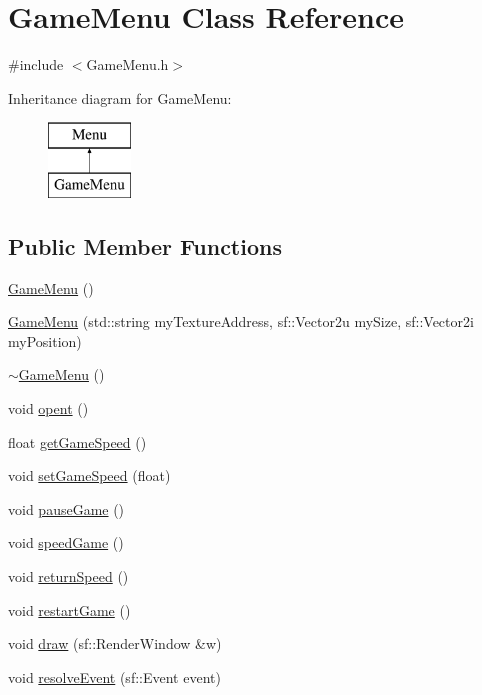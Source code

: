 \hypertarget{class_game_menu}{\section{Game\+Menu Class Reference}
\label{class_game_menu}
}


{\ttfamily \#include $<$Game\+Menu.\+h$>$}

Inheritance diagram for Game\+Menu\+:\begin{figure}[H]
\begin{center}
\leavevmode
\includegraphics[height=2.000000cm]{class_game_menu}
\end{center}
\end{figure}
\subsection*{Public Member Functions}
\begin{DoxyCompactItemize}
\item 
\hyperlink{class_game_menu_ae31c50148abf655297a2a3eab53c15a3}{Game\+Menu} ()
\item 
\hyperlink{class_game_menu_ac3c079d7180f1127d86c7f44c34c4f5d}{Game\+Menu} (std\+::string my\+Texture\+Address, sf\+::\+Vector2u my\+Size, sf\+::\+Vector2i my\+Position)
\item 
\hyperlink{class_game_menu_a70ac0e31f882993f09eb1bdbdd352a56}{$\sim$\+Game\+Menu} ()
\item 
void \hyperlink{class_game_menu_af564d47068179979d48904e73455a542}{opent} ()
\item 
float \hyperlink{class_game_menu_a601a07a24fe40342bdc678ded8d4b6e4}{get\+Game\+Speed} ()
\item 
void \hyperlink{class_game_menu_afe832b00cc0ac1e35b702391d613de25}{set\+Game\+Speed} (float)
\item 
void \hyperlink{class_game_menu_a248194828f1a914fd1f09d263a0326d0}{pause\+Game} ()
\item 
void \hyperlink{class_game_menu_a88426fac8dc01247d626a12f38643616}{speed\+Game} ()
\item 
void \hyperlink{class_game_menu_a9f77fb9dcfdebc1ba96af75ee3083abc}{return\+Speed} ()
\item 
void \hyperlink{class_game_menu_a77617acfe92a25cf97d0da8197ff5e92}{restart\+Game} ()
\item 
void \hyperlink{class_game_menu_aabc9ea58600553c8562881d069c67d2c}{draw} (sf\+::\+Render\+Window \&w)
\item 
void \hyperlink{class_game_menu_a9dd958097e685b1904cdc1c8d2a9ffff}{resolve\+Event} (sf\+::\+Event event)
\end{DoxyCompactItemize}
